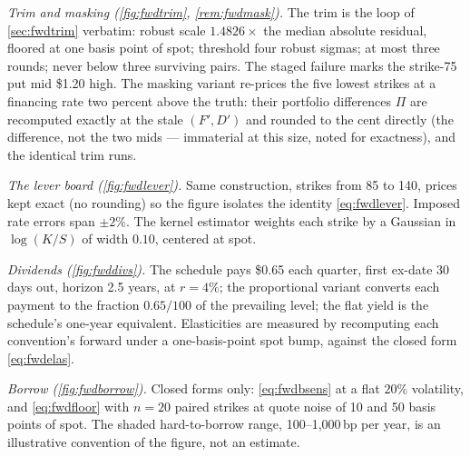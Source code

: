 \emph{Trim and masking (\cref{fig:fwdtrim},
\cref{rem:fwdmask}).}  The trim is the loop of \cref{sec:fwdtrim}
verbatim: robust scale $1.4826\times$ the median absolute residual,
floored at one basis point of spot; threshold four robust sigmas; at
most three rounds; never below three surviving pairs.  The staged
failure marks the strike-75 put mid \$1.20 high.  The masking
variant re-prices the five lowest strikes at a financing rate two
percent above the truth: their portfolio differences $\Pi$ are
recomputed exactly at the stale $(F',D')$ and rounded to the cent
directly (the difference, not the two mids --- immaterial at this
size, noted for exactness), and the identical trim runs.

\emph{The lever board (\cref{fig:fwdlever}).}  Same construction,
strikes from 85 to 140, prices kept exact (no rounding) so the
figure isolates the identity \eqref{eq:fwdlever}.  Imposed rate
errors span $\pm2\%$.  The kernel estimator weights each strike by a
Gaussian in $\log(K/S)$ of width $0.10$, centered at spot.

\emph{Dividends (\cref{fig:fwddivs}).}  The schedule pays \$0.65
each quarter, first ex-date 30 days out, horizon 2.5 years, at
$r=4\%$; the proportional variant converts each payment to the
fraction $0.65/100$ of the prevailing level; the flat yield is the
schedule's one-year equivalent.  Elasticities are measured by
recomputing each convention's forward under a one-basis-point spot
bump, against the closed form \eqref{eq:fwdelas}.

\emph{Borrow (\cref{fig:fwdborrow}).}  Closed forms only:
\eqref{eq:fwdbsens} at a flat $20\%$ volatility, and
\eqref{eq:fwdfloor} with $n=20$ paired strikes at quote noise of 10
and 50 basis points of spot.  The shaded hard-to-borrow range,
100--1{,}000\,bp per year, is an illustrative convention of the
figure, not an estimate.
